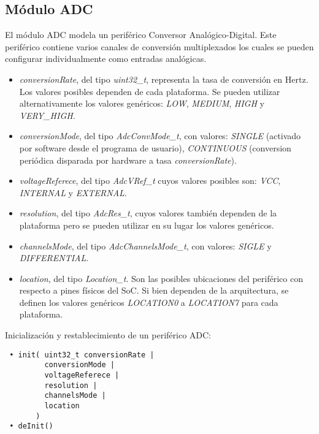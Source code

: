 \subsection{Módulo ADC}

El módulo ADC modela un periférico Conversor Analógico-Digital. Este periférico contiene varios canales de conversión multiplexados los cuales se pueden configurar individualmente como entradas analógicas.


\begin{itemize}
\item
\emph{conversionRate}, del tipo \emph{uint32\_t}, representa la tasa de conversión en Hertz. Los valores posibles dependen de cada plataforma. Se pueden utilizar alternativamente los valores genéricos: \emph{LOW}, \emph{MEDIUM}, \emph{HIGH} y \emph{VERY\_HIGH}.
\item
\emph{conversionMode}, del tipo \emph{AdcConvMode\_t}, con valores: \emph{SINGLE} (activado por software desde el programa de usuario), \emph{CONTINUOUS} (conversion periódica disparada por hardware a tasa \emph{conversionRate}).%
\item
\emph{voltageReferece}, del tipo \emph{AdcVRef\_t} cuyos valores posibles son: \emph{VCC}, \emph{INTERNAL} y \emph{EXTERNAL}.
\item
\emph{resolution}, del tipo \emph{AdcRes\_t}, cuyos valores también dependen de la plataforma pero se pueden utilizar en su lugar los valores genéricos.
\item
\emph{channelsMode}, del tipo \emph{AdcChannelsMode\_t}, con valores: \emph{SIGLE} y \emph{DIFFERENTIAL}.
\item
\emph{location}, del tipo \emph{Location\_t}. Son las posibles ubicaciones del periférico con respecto a pines físicos del SoC. Si bien dependen de la arquitectura, se definen los valores genéricos \emph{LOCATION0} a \emph{LOCATION7} para cada plataforma.
\end{itemize}


Inicialización y restablecimiento de un periférico ADC:

\begin{verbatim}
 • init( uint32_t conversionRate | 
         conversionMode |
         voltageReferece |
         resolution |
         channelsMode |
         location
       )
 • deInit()
\end{verbatim}

